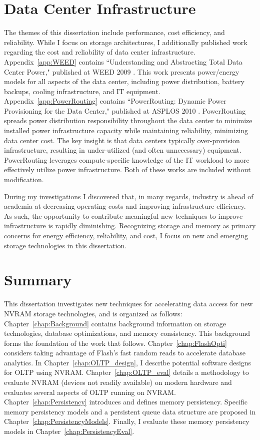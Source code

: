 \section{Data Center Infrastructure}
\label{sec:Intro:Additional}
The themes of this dissertation include performance, cost efficiency, and reliability.
While I focus on storage architectures, I additionally published work regarding the cost and reliability of data center infrastructure.
Appendix~\ref{app:WEED} contains ``Understanding and Abstracting Total Data Center Power," published at WEED 2009 \cite{PelleyMeisner09}.
This work presents power/energy models for all aspects of the data center, including power distribution, battery backups, cooling infrastructure, and IT equipment.
Appendix~\ref{app:PowerRouting} contains ``PowerRouting: Dynamic Power Provisioning for the Data Center," published at ASPLOS 2010 \cite{PelleyMeisner10}.
PowerRouting spreads power distribution responsibility throughout the data center to minimize installed power infrastructure capacity while maintaining reliability, minimizing data center cost.
The key insight is that data centers typically over-provision infrastructure, resulting in under-utilized (and often unnecessary) equipment.
PowerRouting leverages compute-specific knowledge of the IT workload to more effectively utilize power infrastructure.
Both of these works are included without modification.

During my investigations I discovered that, in many regards, industry is ahead of academia at decreasing operating costs and improving infrastructure efficiency.
As such, the opportunity to contribute meaningful new techniques to improve infrastructure is rapidly diminishing.
Recognizing storage and memory as primary concerns for energy efficiency, reliability, and cost, I focus on new and emerging storage technologies in this dissertation.

\section{Summary}
\label{sec:Intro:Summary}
This dissertation investigates new techniques for accelerating data access for new NVRAM storage technologies, and is organized as follows:
Chapter~\ref{chap:Background} contains background information on storage technologies, database optimizations, and memory consistency.
This background forms the foundation of the work that follows.
Chapter~\ref{chap:FlashOpti} considers taking advantage of Flash's fast random reads to accelerate database analytics.
In Chapter~\ref{chap:OLTP_design}, I describe potential software designs for OLTP using NVRAM.
Chapter~\ref{chap:OLTP_eval} details a methodology to evaluate NVRAM (devices not readily available) on modern hardware and evaluates several aspects of OLTP running on NVRAM.
Chapter~\ref{chap:Persistency} introduces and defines memory persistency.
Specific memory persistency models and a persistent queue data structure are proposed in Chapter~\ref{chap:PersistencyModels}.
Finally, I evaluate these memory persistency models in Chapter~\ref{chap:PersistencyEval}.
